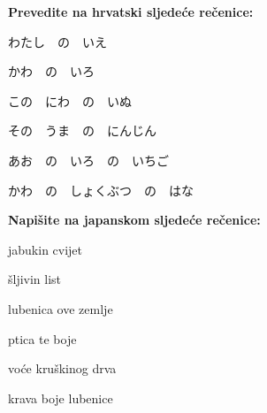 
\author{Tomislav Mamić, Željka Ludošan}


	
	\normalsize \textbf{Prevedite na hrvatski sljedeće rečenice:}	
	
	\begin{mondai}{}
		\item わたし　の　いえ
		\item かわ　の　いろ

		\item この　にわ　の　いぬ
		\item その　うま　の　にんじん

		\item あお　の　いろ　の　いちご
		\item かわ　の　しょくぶつ　の　はな
	\end{mondai}
	
	\normalsize \textbf{Napišite na japanskom sljedeće rečenice:}	
	
	\begin{mondai}{}
		\item jabukin cvijet
		\item šljivin list

		\item lubenica ove zemlje
		\item ptica te boje

		\item voće kruškinog drva
		\item krava boje lubenice
	\end{mondai}



